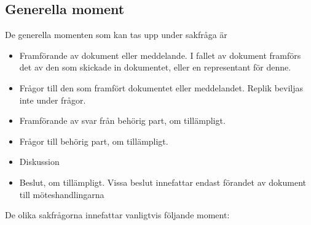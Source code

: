 \documentclass[11pt, includeaddress]{classes/cthit}
\begin{document}
\subsection{Generella moment}
De generella momenten som kan tas upp under sakfråga är
\begin{itemize}
        \item Framförande av dokument eller meddelande. I fallet av dokument framförs det av den som skickade in dokumentet, eller en representant för denne.
        \item Frågor till den som framfört dokumentet eller meddelandet. Replik beviljas inte under frågor.
        \item Framförande av svar från behörig part, om tillämpligt.
        \item Frågor till behörig part, om tillämpligt.
        \item Diskussion
        \item Beslut, om tillämpligt. Vissa beslut innefattar endast förandet av dokument till möteshandlingarna
\end{itemize}
De olika sakfrågorna innefattar vanligtvis följande moment:
\end{document}

